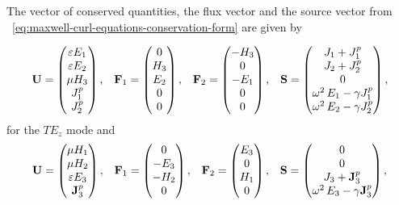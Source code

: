 The vector of conserved quantities, the flux vector and the source vector from ~\eqref{eq:maxwell-curl-equations-conservation-form} are given by

\begin{equation*}
  \begin{array}{ccccc}
    \mathbf{U} = \begin{pmatrix} \varepsilon E_1 \\ \varepsilon E_2 \\ \mu H_3 \\ J^p_1 \\  J^p_2 \end{pmatrix} ,
 &
   \mathbf{F}_1 = \begin{pmatrix} 0 \\ H_3 \\ E_2 \\ 0 \\  0 \end{pmatrix} ,
 &
   \mathbf{F}_2 = \begin{pmatrix} - H_3 \\ 0 \\ -E_1 \\ 0 \\ 0 \end{pmatrix} ,
 &
   \mathbf{S} = \begin{pmatrix} J_1 + J^p_1 \\ J_2+ J^p_2 \\ 0 \\ \omega^2 \, E_1 - \gamma J^p_1 \\  \omega^2 \, E_2 - \gamma J^p_2 \end{pmatrix} ,
  \end{array}
\end{equation*}
for the $TE_z$ mode and
\begin{equation*}
  \begin{array}{ccccc}
    \mathbf{U} = \begin{pmatrix} \mu H_1 \\ \mu H_2 \\ \varepsilon E_3 \\ \mathbf{J}^p_3 \end{pmatrix} ,
 &
   \mathbf{F}_1 = \begin{pmatrix} 0 \\ -E_3 \\ -H_2 \\ 0 \end{pmatrix} ,
 &
   \mathbf{F}_2 = \begin{pmatrix} E_3 \\ 0 \\ H_1 \\ 0 \end{pmatrix} ,
 &
   \mathbf{S} = \begin{pmatrix} 0 \\ 0 \\ J_3 + \mathbf{J}^p_3 \\ \omega^2 \, E_3 - \gamma \mathbf{J}^p_3 \end{pmatrix} ,
  \end{array}
\end{equation*}
